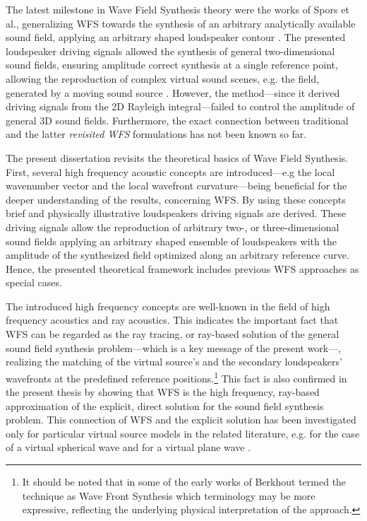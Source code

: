 The latest milestone in Wave Field Synthesis theory were the works of Spors et al., generalizing WFS towards the synthesis of an arbitrary analytically available sound field, applying an arbitrary shaped loudspeaker contour \cite{Rabenstein2007, Spors2008:WFSrevisited}.
The presented loudspeaker driving signals allowed the synthesis of general two-dimensional sound fields, ensuring amplitude correct synthesis at a single reference point,
allowing the reproduction of complex virtual sound scenes, e.g. the field, generated by a moving sound source \cite{Ahrens2008moving, Ahrens2008moving_b, Ahrens2011_moving_source_WFS}.
However, the method---since it derived driving signals from the 2D Rayleigh integral---failed to control the amplitude of general 3D sound fields.
Furthermore, the exact connection between traditional and the latter \emph{revisited WFS} formulations has not been known so far.

\vspace{3mm}
The present dissertation revisits the theoretical basics of Wave Field Synthesis.
First, several high frequency acoustic concepts are introduced---e.g the local wavenumber vector and the local wavefront curvature---being beneficial for the deeper understanding of the results, concerning WFS.
By using these concepts brief and physically illustrative loudspeakers driving signals are derived.
These driving signals allow the reproduction of arbitrary two-, or three-dimensional sound fields applying an arbitrary shaped ensemble of loudspeakers with the amplitude of the synthesized field optimized along an arbitrary reference curve.
Hence, the presented theoretical framework includes previous WFS approaches as special cases.

The introduced high frequency concepts are well-known in the field of high frequency acoustics and ray acoustics.
This indicates the important fact that WFS can be regarded as the ray tracing, or ray-based solution of the general sound field synthesis problem---which is a key message of the present work---, realizing the matching of the virtual source's and the secondary loudspeakers' wavefronts at the predefined reference positions.\footnote{It should be noted that in some of the early works of Berkhout termed the technique as Wave Front Synthesis \cite{berkhout1992wave, doi:10.1121/1.404755} which terminology may be more expressive, reflecting the underlying physical interpretation of the approach.}
This fact is also confirmed in the present thesis by showing that WFS is the high frequency, ray-based approximation of the explicit, direct solution for the sound field synthesis problem.
This connection of WFS and the explicit solution has been investigated only for particular virtual source models in the related literature, e.g. for the case of a virtual spherical wave \cite{Spors2010:analysis_and_improvement} and for a virtual plane wave \cite{Schultz2016:DAGA}.


